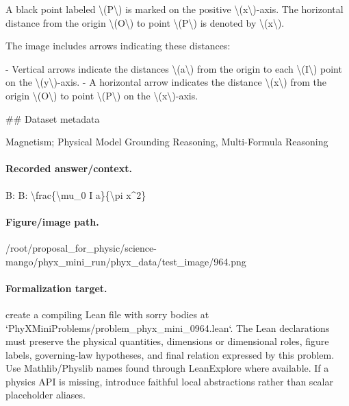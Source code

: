 A black point labeled \textbackslash{}(P\textbackslash{}) is marked on the positive \textbackslash{}(x\textbackslash{})-axis. The horizontal distance from the origin \textbackslash{}(O\textbackslash{}) to point \textbackslash{}(P\textbackslash{}) is denoted by \textbackslash{}(x\textbackslash{}).

The image includes arrows indicating these distances:

- Vertical arrows indicate the distances \textbackslash{}(a\textbackslash{}) from the origin to each \textbackslash{}(I\textbackslash{}) point on the \textbackslash{}(y\textbackslash{})-axis.
- A horizontal arrow indicates the distance \textbackslash{}(x\textbackslash{}) from the origin \textbackslash{}(O\textbackslash{}) to point \textbackslash{}(P\textbackslash{}) on the \textbackslash{}(x\textbackslash{})-axis.

\#\# Dataset metadata

Magnetism; Physical Model Grounding Reasoning, Multi-Formula Reasoning

\paragraph{Recorded answer/context.}
B: B: \textbackslash{}frac\{\textbackslash{}mu\_0 I a\}\{\textbackslash{}pi x\textasciicircum{}2\}

\paragraph{Figure/image path.}
/root/proposal\_for\_physic/science-mango/phyx\_mini\_run/phyx\_data/test\_image/964.png

\paragraph{Formalization target.}
create a compiling Lean file with sorry bodies at `PhyXMiniProblems/problem\_phyx\_mini\_0964.lean`. The Lean declarations must preserve the physical quantities, dimensions or dimensional roles, figure labels, governing-law hypotheses, and final relation expressed by this problem.
Use Mathlib/Physlib names found through LeanExplore where available. If a physics API is missing, introduce faithful local abstractions rather than scalar placeholder aliases.

